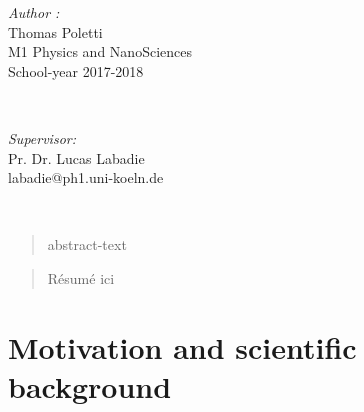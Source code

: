 \documentclass[a4paper,twoside,11pt]{article}
\makeatletter
\newcommand\frontmatter{%
    \clearpage
  \pagenumbering{roman}}
\newcommand\mainmatter{%
    \clearpage
  \pagenumbering{arabic}}
\makeatother
\begin{document}
\begin{titlepage}
	
	\begin{minipage}{0.4\textwidth}
		\begin{flushleft} \large
			\emph{Author :} \\
			Thomas Poletti\\
          M1 Physics and NanoSciences\\
          School-year 2017-2018\\
			\end{flushleft}
			\end{minipage}~
			\begin{minipage}{0.4\textwidth}
            
			\begin{flushright} \large
   			\emph{Supervisor:}\\
			Pr. Dr. Lucas Labadie\\
            labadie@ph1.uni-koeln.de\\
		\end{flushright}
        
	\end{minipage}\\[2 cm]
	
    
    
	
\end{titlepage}

\frontmatter
\begin{abstract}
   abstract-text
\end{abstract}
\renewcommand{\abstractname}{Résumé}
\newpage
\begin{abstract}
   Résumé ici
\end{abstract}

\newpage
\tableofcontents
\listoffigures
\listoftables

\clearpage

\mainmatter
\section{Motivation and scientific background}

\end{document}
